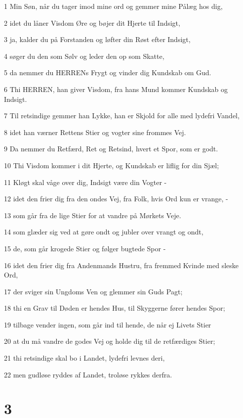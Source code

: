\par 1 Min Søn, når du tager imod mine ord og gemmer mine Pålæg hos dig,
\par 2 idet du låner Visdom Øre og bøjer dit Hjerte til Indsigt,
\par 3 ja, kalder du på Forstanden og løfter din Røst efter Indsigt,
\par 4 søger du den som Sølv og leder den op som Skatte,
\par 5 da nemmer du HERRENs Frygt og vinder dig Kundskab om Gud.
\par 6 Thi HERREN, han giver Visdom, fra hans Mund kommer Kundskab og Indsigt.
\par 7 Til retsindige gemmer han Lykke, han er Skjold for alle med lydefri Vandel,
\par 8 idet han værner Rettens Stier og vogter sine frommes Vej.
\par 9 Da nemmer du Retfærd, Ret og Retsind, hvert et Spor, som er godt.
\par 10 Thi Visdom kommer i dit Hjerte, og Kundskab er liflig for din Sjæl;
\par 11 Kløgt skal våge over dig, Indsigt være din Vogter -
\par 12 idet den frier dig fra den ondes Vej, fra Folk, hvis Ord kun er vrange, -
\par 13 som går fra de lige Stier for at vandre på Mørkets Veje.
\par 14 som glæder sig ved at gøre ondt og jubler over vrangt og ondt,
\par 15 de, som går krogede Stier og følger bugtede Spor -
\par 16 idet den frier dig fra Andenmands Hustru, fra fremmed Kvinde med sleske Ord,
\par 17 der sviger sin Ungdoms Ven og glemmer sin Guds Pagt;
\par 18 thi en Grav til Døden er hendes Hus, til Skyggerne fører hendes Spor;
\par 19 tilbage vender ingen, som går ind til hende, de når ej Livets Stier
\par 20 at du må vandre de godes Vej og holde dig til de retfærdiges Stier;
\par 21 thi retsindige skal bo i Landet, lydefri levnes deri,
\par 22 men gudløse ryddes af Landet, troløse rykkes derfra.

\chapter{3}

